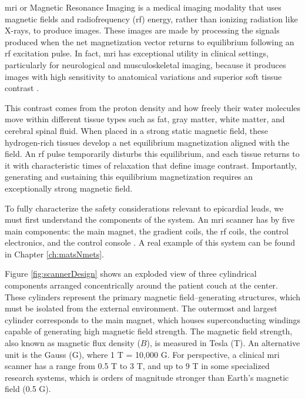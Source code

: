 \gls{mri} or Magnetic Resonance Imaging is a medical imaging modality that uses magnetic fields and radiofrequency (\gls{rf}) energy, rather than ionizing radiation like X-rays, to produce images. These images are made by processing the signals produced when the net magnetization vector returns to equilibrium following an \gls{rf} excitation pulse. In fact, \gls{mri} has exceptional utility in clinical settings, particularly for neurological and musculoskeletal imaging, because it produces images with high sensitivity to anatomical variations and superior soft tissue contrast \cite{bushberg2011}. 

This contrast comes from the proton density and how freely their water molecules move within different tissue types such as fat, gray matter, white matter, and cerebral spinal fluid. When placed in a strong static magnetic field, these hydrogen-rich tissues develop a net equilibrium magnetization aligned with the field. An \gls{rf} pulse temporarily disturbs this equilibrium, and each tissue returns to it with characteristic times of relaxation that define image contrast. Importantly, generating and sustaining this equilibrium magnetization requires an exceptionally strong magnetic field.

To fully characterize the safety considerations relevant to epicardial leads, we must first understand the components of the system. An \gls{mri} scanner has by five main components: the main magnet, the gradient coils, the \gls{rf} coils, the control electronics, and the control console \cite{Prince_MedicalImaging_2015}. A real example of this system can be found in Chapter \ref{ch:matsNmets}. 

Figure \ref{fig:scannerDesign} shows an exploded view of three cylindrical components arranged concentrically around the patient couch at the center. These cylinders represent the primary magnetic field–generating structures, which must be isolated from the external environment. The outermost and largest cylinder corresponds to the main magnet, which houses superconducting windings capable of generating high magnetic field strength. The magnetic field strength, also known as magnetic flux density ($B$), is measured in Tesla (T). An alternative unit is the Gauss (G), where 1 T = 10,000 G. For perspective, a clinical \gls{mri} scanner has a range from 0.5 T to 3 T, and up to 9 T in some specialized research systems, which is orders of magnitude stronger than Earth's magnetic field (0.5 G)\cite{bushberg2011, Prince_MedicalImaging_2015,lowrie1997fundamentals}. %

